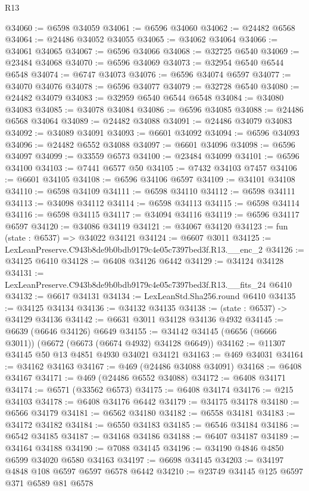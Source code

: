 \begin{lexlean}{R13}
\begin{coremodule}
@34060 := @6598 @34059
@34061 := @6596 @34060
@34062 := @24482 @6568
@34064 := @24486 @34052 @34055
@34065 := @34062 @34064
@34066 := @34061 @34065
@34067 := @6596 @34066
@34068 := @32725 @6540
@34069 := @23484 @34068
@34070 := @6596 @34069
@34073 := @32954 @6540 @6544 @6548
@34074 := @6747 @34073
@34076 := @6596 @34074 @6597
@34077 := @34070 @34076
@34078 := @6596 @34077
@34079 := @32728 @6540
@34080 := @24482 @34079
@34083 := @32959 @6540 @6544 @6548
@34084 := @34080 @34083
@34085 := @34078 @34084
@34086 := @6596 @34085
@34088 := @24486 @6568 @34064
@34089 := @24482 @34088
@34091 := @24486 @34079 @34083
@34092 := @34089 @34091
@34093 := @6601 @34092
@34094 := @6596 @34093
@34096 := @24482 @6552 @34088
@34097 := @6601 @34096
@34098 := @6596 @34097
@34099 := @33559 @6573
@34100 := @23484 @34099
@34101 := @6596 @34100
@34103 := @7441 @6577 @50
@34105 := @7432 @34103 @7457
@34106 := @6601 @34105
@34108 := @6596 @34106 @6597
@34109 := @34101 @34108
@34110 := @6598 @34109
@34111 := @6598 @34110
@34112 := @6598 @34111
@34113 := @34098 @34112
@34114 := @6598 @34113
@34115 := @6598 @34114
@34116 := @6598 @34115
@34117 := @34094 @34116
@34119 := @6596 @34117 @6597
@34120 := @34086 @34119
@34121 := @34067 @34120
@34123 := fun (state : @6537) => @34022 @34121
@34124 := @6607 @3011
@34125 := LexLeanPreserve.C943b8de9b0bdb9179c4e05c7397bed3f.R13.__enc_2
@34126 := @34125 @6410
@34128 := @6408 @34126 @6442
@34129 := @34124 @34128
@34131 := LexLeanPreserve.C943b8de9b0bdb9179c4e05c7397bed3f.R13.__fits_24 @6410
@34132 := @6617 @34131
@34134 := LexLeanStd.Sha256.round @6410
@34135 := @34125 @34134
@34136 := @34132 @34135
@34138 := (state : @6537) -> @34129 @34136
@34142 := @6631 @3011 @34128 @34136 @4932
@34145 := @6639 (@6646 @34126) @6649
@34155 := @34142 @34145 (@6656 (@6666 @3011)) (@6672 (@6673 (@6674 @4932) @34128 @6649))
@34162 := @11307 @34145 @50 @13 @4851 @4930 @34021 @34121
@34163 := @469 @34031
@34164 := @34162 @34163
@34167 := @469 (@24486 @34088 @34091)
@34168 := @6408 @34167
@34171 := @469 (@24486 @6552 @34088)
@34172 := @6408 @34171
@34174 := @6571 (@33562 @6573)
@34175 := @6408 @34174
@34176 := @215 @34103
@34178 := @6408 @34176 @6442
@34179 := @34175 @34178
@34180 := @6566 @34179
@34181 := @6562 @34180
@34182 := @6558 @34181
@34183 := @34172 @34182
@34184 := @6550 @34183
@34185 := @6546 @34184
@34186 := @6542 @34185
@34187 := @34168 @34186
@34188 := @6407 @34187
@34189 := @34164 @34188
@34190 := @7088 @34145
@34196 := @34190 @4846 @4850 @6599 @34020 @6580 @34163
@34197 := @6698 @34145
@34203 := @34197 @4848 @108 @6597 @6597 @6578 @6442
@34210 := @23749 @34145 @125 @6597 @371 @6589 @81 @6578

\end{coremodule}
\end{lexlean}
